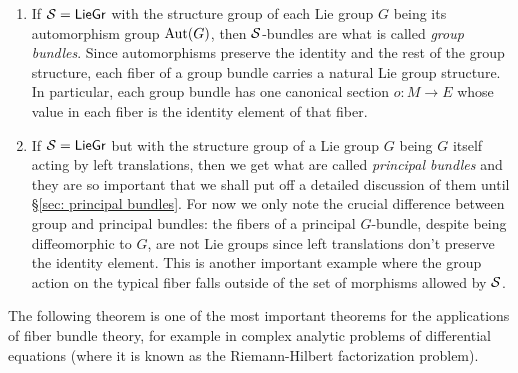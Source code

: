 \begin{example}
    \begin{enumerate}
        \item If $\mathcal{S}=\mathsf{LieGr}$ with the structure group of each Lie group $G$ being its automorphism group $\operatorname{Aut}(G)$, then $\mathcal{S}$-bundles are what is called \emph{group bundles}. Since automorphisms preserve the identity and the rest of the group structure, each fiber of a group bundle carries a natural Lie group structure. In particular, each group bundle has one canonical section $o:M\to E$ whose value in each fiber is the identity element of that fiber.
        
        \item If $\mathcal{S}=\mathsf{LieGr}$ but with the structure group of a Lie group $G$ being $G$ itself acting by left translations, then we get what are called \emph{principal bundles} and they are so important that we shall put off a detailed discussion of them until \S\ref{sec: principal bundles}. For now we only note the crucial difference between group and principal bundles: the fibers of a principal $G$-bundle, despite being diffeomorphic to $G$, are not Lie groups since left translations don't preserve the identity element. This is another important example where the group action on the typical fiber falls outside of the set of morphisms allowed by $\mathcal{S}$.
    \end{enumerate}
\end{example}

The following theorem is one of the most important theorems for the applications of fiber bundle theory, for example in complex analytic problems of differential equations (where it is known as the Riemann-Hilbert factorization problem).

